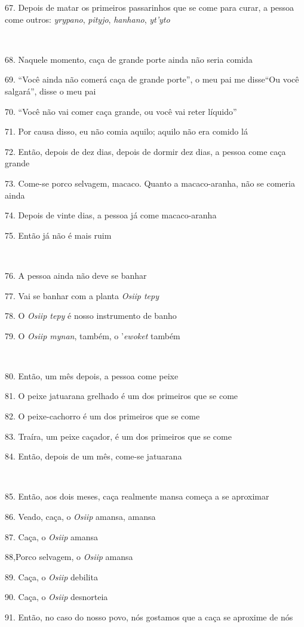 67. Depois de matar os primeiros passarinhos que se come para curar, a
pessoa come outros: \emph{yrypano}, \emph{pityjo}, \emph{hanhano},
\emph{yt'yto}

~

68. Naquele momento, caça de grande porte ainda não seria comida

69. ``Você ainda não comerá caça de grande porte'', o meu pai me
disse``Ou você salgará'', disse o meu pai

70. ``Você não vai comer caça grande, ou você vai reter líquido''

71. Por causa disso, eu não comia aquilo; aquilo não era comido lá

72. Então, depois de dez dias, depois de dormir dez dias, a pessoa come
caça grande

73. Come-se porco selvagem, macaco. Quanto a macaco-aranha, não se comeria ainda

74. Depois de vinte dias, a pessoa já come macaco-aranha

75. Então já não é mais ruim

~

76. A pessoa ainda não deve se banhar

77. Vai se banhar com a planta \emph{Osiip tepy}

78. O \emph{Osiip tepy} é nosso instrumento de banho

79. O \emph{Osiip mynan}, também, o '\emph{ewoket} também

~

80. Então, um mês depois, a pessoa come peixe

81. O peixe jatuarana grelhado é um dos primeiros que se come

82. O peixe-cachorro é um dos primeiros que se come

83. Traíra, um peixe caçador, é um dos primeiros que se come

84. Então, depois de um mês, come-se jatuarana

~

85. Então, aos dois meses, caça realmente mansa começa a se aproximar

86. Veado, caça, o \emph{Osiip} amansa, amansa

87. Caça, o \emph{Osiip} amansa

88,Porco selvagem, o \emph{Osiip} amansa

89. Caça, o \emph{Osiip} debilita

90. Caça, o \emph{Osiip} desnorteia

91. Então, no caso do nosso povo, nós gostamos que a caça se aproxime de nós

